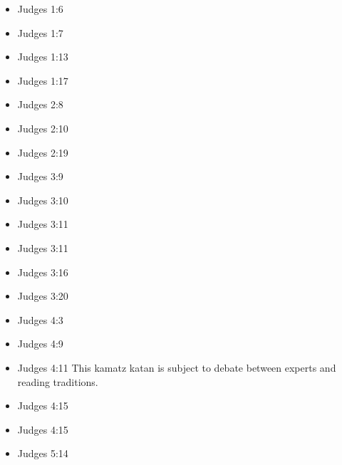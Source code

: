 \documentclass[14pt]{article}
\begin{document}
		\begin{multicols}{2}\begin{itemize}
			
			\item Judges 1:6
			
			\item Judges 1:7
			
			\item Judges 1:13
			
			\item Judges 1:17
			
			\item Judges 2:8
			
			\item Judges 2:10
			
			\item Judges 2:19
			
			\item Judges 3:9
			
			\item Judges 3:10
			
			\item Judges 3:11
			
			\item Judges 3:11
			
			\item Judges 3:16
			
			\item Judges 3:20
			
			\item Judges 4:3
			
			\item Judges 4:9
			
			\item Judges 4:11 This kamatz katan is subject to debate between experts and reading traditions.
			
			\item Judges 4:15
			
			\item Judges 4:15
			
			\item Judges 5:14
			

\end{itemize}
\end{multicols}
\end{document}
